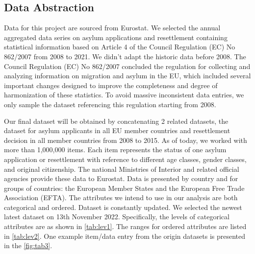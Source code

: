 \documentclass[journal]{vgtc}                %
\begin{document}
\subsection{Data Abstraction}
Data for this project are sourced from Eurostat. We selected the annual aggregated data series on asylum applications and resettlement containing statistical information based on Article 4 of the Council Regulation (EC) No 862/2007 from 2008 to 2021. We didn’t adapt the historic data before 2008. The Council Regulation (EC) No 862/2007 concluded the regulation for collecting and analyzing information on migration and asylum in the EU, which included several important changes designed to improve the completeness and degree of harmonization of these statistics\cite{eur_law:2007}. To avoid massive inconsistent data entries, we only sample the dataset referencing this regulation starting from 2008.

Our final dataset will be obtained by concatenating 2 related datasets, the dataset for asylum applicants in all EU member countries and resettlement decision in all member countries from 2008 to 2015. As of today, we worked with more than 1,000,000 items. Each item represents the status of one asylum application or resettlement with reference to different age classes, gender classes, and original citizenship. The national Ministries of Interior and related official agencies provide these data to Eurostat. Data is presented by country and for groups of countries: the European Member States and the European Free Trade Association (EFTA). The attributes we intend to use in our analysis are both categorical and ordered. Dataset is constantly updated\cite{european_commission:2021}. We selected the newest latest dataset on 13th November 2022. Specifically, the levels of categorical attributes are as shown in \autoref{tab:lev1}. The ranges for ordered attributes are listed in \autoref{tab:lev2}. One example item/data entry from the origin datasets is presented in the \autoref{fig:tab3}.
\end{document}
